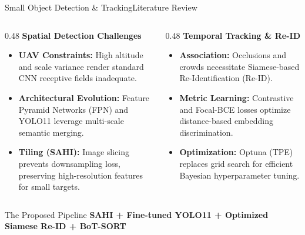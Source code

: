 \documentclass[10pt]{beamer}
\begin{document}
    \begin{frame}{Small Object Detection \& Tracking}{Literature Review}
    	\begin{columns}[T]
    		\begin{column}{0.48\textwidth}
    			\textbf{Spatial Detection Challenges}
    			\begin{itemize}
    				\scriptsize
    				\item \textbf{UAV Constraints:} High altitude and scale variance render standard CNN receptive fields inadequate.
    				\item \textbf{Architectural Evolution:} Feature Pyramid Networks (FPN) and YOLO11 leverage multi-scale semantic merging.
    				\item \textbf{Tiling (SAHI):} Image slicing prevents downsampling loss, preserving high-resolution features for small targets.
    			\end{itemize}
    		\end{column}
    		
    		\begin{column}{0.48\textwidth}
    			\textbf{Temporal Tracking \& Re-ID}
    			\begin{itemize}
    				\scriptsize
    				\item \textbf{Association:} Occlusions and crowds necessitate Siamese-based Re-Identification (Re-ID).
    				\item \textbf{Metric Learning:} Contrastive and Focal-BCE losses optimize distance-based embedding discrimination.
    				\item \textbf{Optimization:} Optuna (TPE) replaces grid search for efficient Bayesian hyperparameter tuning.
    			\end{itemize}
    		\end{column}
    	\end{columns}
    	
    	\vspace{0.4cm}
    	\begin{block}{The Proposed Pipeline}
    		\centering \footnotesize
    		\textbf{SAHI + Fine-tuned YOLO11 + Optimized Siamese Re-ID + BoT-SORT}
    	\end{block}
    \end{frame}


    



\end{document}
